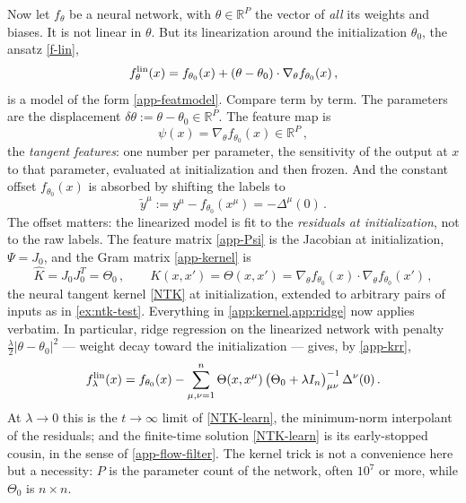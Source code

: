 \documentclass[11pt]{article}
\newcommand{\R}{\mathbb{R}}
\begin{document}
Now let $f_\theta$ be a neural network, with $\theta\in\R^P$ the vector of \emph{all} its weights and biases. It is not linear in $\theta$. But its linearization around the initialization $\theta_0$, the ansatz \eqref{f-lin},
%
\begin{equation}
    f^{\rm lin}_\theta(x) = f_{\theta_0}(x) + (\theta-\theta_0)\cdot\nabla_\theta f_{\theta_0}(x)\,, \label{app-flin}
\end{equation}
%
is a model of the form \eqref{app-featmodel}. Compare term by term. The parameters are the displacement $\delta\theta := \theta-\theta_0\in\R^P$. The feature map is
%
\begin{equation}
    \psi(x) = \nabla_\theta f_{\theta_0}(x)\in\R^P\,, \label{app-tangent-features}
\end{equation}
%
the \emph{tangent features}: one number per parameter, the sensitivity of the output at $x$ to that parameter, evaluated at initialization and then frozen. And the constant offset $f_{\theta_0}(x)$ is absorbed by shifting the labels to
%
\begin{equation}
    \tilde y^\mu := y^\mu - f_{\theta_0}(x^\mu) = -\Delta^\mu(0)\,. \label{app-shifted-labels}
\end{equation}
%
The offset matters: the linearized model is fit to the \emph{residuals at initialization}, not to the raw labels. The feature matrix \eqref{app-Psi} is the Jacobian at initialization, $\Psi = J_0$, and the Gram matrix \eqref{app-kernel} is
%
\begin{equation}
    \hat K = J_0J_0^T = \Theta_0\,,\qquad K(x,x') = \Theta(x,x') = \nabla_\theta f_{\theta_0}(x)\cdot\nabla_\theta f_{\theta_0}(x')\,, \label{app-K-is-NTK}
\end{equation}
%
the neural tangent kernel \eqref{NTK} at initialization, extended to arbitrary pairs of inputs as in \cref{ex:ntk-test}. Everything in \cref{app:kernel,app:ridge} now applies verbatim. In particular, ridge regression on the linearized network with penalty $\frac{\lambda}{2}|\theta-\theta_0|^2$ --- weight decay toward the initialization --- gives, by \eqref{app-krr},
%
\begin{equation}
    f^{\rm lin}_\lambda(x) = f_{\theta_0}(x) - \sum_{\mu,\nu=1}^n \Theta(x,x^\mu)\,\big(\Theta_0 + \lambda I_n\big)^{-1}_{\mu\nu}\,\Delta^\nu(0)\,. \label{app-lin-krr}
\end{equation}
%
At $\lambda\to 0$ this is the $t\to\infty$ limit of \eqref{NTK-learn}, the minimum-norm interpolant of the residuals; and the finite-time solution \eqref{NTK-learn} is its early-stopped cousin, in the sense of \eqref{app-flow-filter}. The kernel trick is not a convenience here but a necessity: $P$ is the parameter count of the network, often $10^7$ or more, while $\Theta_0$ is $n\times n$.
\end{document}
